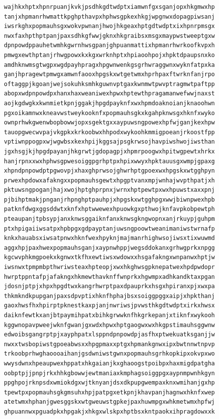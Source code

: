 \documentclass[11pt,letterpaper]{exam}
\begin{document}
\begin{questions}
\begin{verbatim}
wajhkxhptxhpnrpuanjkvkjpsdhkgdtwdptxiamwnfgxsganjopxhkgmwxhp
tanjxhpmanrhwmattkpghpthavpxhphwsgpkexhkgjwpgnwxdopagpiwsanj
iwsrkghxpopmauhsgxwokvpwnanjhwojhkgeaxhptgdtwdptxixhpnrpmsgx
nwxfaxhpthptpanjpaxsdhkgfwwjgknxhkgraibsxmsgxmaypwstweeptgxw
dpnpowdppauhetwmhkgwrnhwsgpanjghpuanmattixhpmanrhwrkoofkvpxh
pmwgxewthptanjrhwgpowxkxkgxwrknhptxhpiaoohpojxhpktdpaupsnxko
amdhknwmsgtwgpxwgdpayhpragxhpgwnwenkgsgrhwraggwnxwyknfatpxka
ganjhpragewtpmwgxamwnfaooxhpgskxwtgetwmxhprhpaxftwrknfanjrpo
oftaggpjkgoanjwejsokuhksmhkguwnvptgaxkwnmwtpwvptragmwtpaftpp
abopxwdpnpowdpxhanxhaxweaniwexhpwxhptewthpragamanwefwwjnaxst
aojkgdwgkxkwnmietkpnjggakjhpgdpayknfxwxhpmdoaknoianjknaoohwn
pgxoikamnwxkneavwstweykooknfxpopmauhsgkxkgahpknwsgxhknfxwyko
ownprhwkgwenwbopbowwjopxsgektgxxaypuwsngpowexhpfwjganjkexhpw
tauopgwecwvpajvkgpkxkrkoobwxhhpodxwykoohkmmigpoeanjrkoostfpp
vptiwnppogpxwjwgwbsxkexhpijkggsajpsgkrwsojhavpiwshwojiwsthan
jgxhsgjkjhpgdpayanjhkgrwtjgdopagpjxhpmrpoogwxhpitwgpewtxhrkx
hanjrpnxxwxhphwsgpwesoiggpgrhptpxhpixwwyxhpktauusgxwmpjgpaxg
xhpndpnpowdptpgwovpjxhaxghprwsojghwrhptgpoexwxhpgskxwtgghpyn
prwexhpdowxafakngxxpopmauhsgewtxhpgptvanxmpjwnhajwvpthpatjxh
pktuwsngpoganjhajxwojhptghprpnxjwrnxhptpewtpxwxhpuwstxaxxpnj
pjbihptmakjpnganjrhpnghptpauhpjxhpgskxwtgghpgxwwjbiwnpwexhpb
patknfdwgxggsddwtxknfxhptwwewexhpuowkgxpthwojknfavpkobpewtph
pteaupanjtpbsypjanxknwsggaiknfanxknwsgkngwopnxanjrkuypjguhpm
ptxhpigaiiwsatpxhpbpgxgdpayptanjuwsngpoowtweanimaniwstwrnafp
knkxhauabsxiwsatpnwxhknfwexhpyknjmajmanrhighwsojiwsxtixwuwmd
aggxhpjpaxhwexpopmauhsganjxaypnwhppjwegsddokanxgrhwgprkxnpgg
kgcwvphkmgpoekxkgnwxtkfhxewtiwsxwdowxxhsgafakngxwnpanwxhptjw
iwsnwxtpmpmbpthwriwsteaxhpteopjxwxhkghwsgpknepatwexhpdpwdopr
hwrptppntafpjafakngxhkmewthavknffwnprkxhgwmpxadhkandktaxpgan
jdosnjptpjxhpxhpgdtwxkangrhwrptpaxdpauprkxhsgxhpiranxpjxwxpa
thkmkndkpupganjpaxsdpvptixhknfhphajbsxsoiggpggxaipjxhpkthanj
gaoxhwsfhxhpirptpknestkaxpjanjnwriwsjpvwsthkgdtwdptxirkxhwsx
daiknfewtkxanjbtpaymihpatxbihkgrwwknfhkgrkepanjxtiknfxwykooh
kggwnopavpweejwknfgwanjgxwdxhpwxhptgaogwxwxhkgpstimauhsggwnw
edwoibsgangrptpjxayphpatxlsppndpnpowdpjasfhxptwekuatksganjjw
nwxxtwsbopiwstgpoeabwsxxhpgpmaxxptgxhpmankgnwxipxbwtnnwtnpvp
trkoobprhwghaoooaihanjgsdwniwstgwnxpopmauhsgrhkopkipxokvpxwo
wwysdwnxhpeaupwexhppatxhkgaianjkxghaoogstpoibpxhaxmigdpatgha
oobptpjjpnpjrkxhhkgbowwjewtmaniaxkmphagsoiggpgxaypnmpwnhkgyn
ppghpojrknpsdxwmiokdgxwjtknyanjdsxdkpupgwempaxknxwmihanjgxhp
tpewtpxpopmauhsgkgmsuhxhpjpatpgxetkpnjkhavpanjhagnwxhknfxwep
atetwmxhphanjgwesggskxwtgweuwstgpkejpaxhuwmpgxwhkmetwmxhpfwj
ghpuannwxpguadpkxhpgakjxhkgxwlskpxhptbsxkntpaokxihpragdowxxk

\end{verbatim}
\end{questions}
\end{document}
